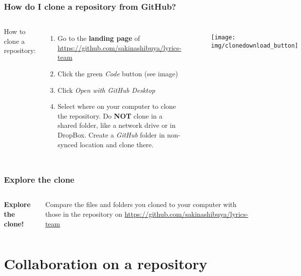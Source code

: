 \documentclass[aspectratio=169]{beamer} %
\newcommand{\trainingURL}[1]{{\color{blue}\url{#1}}}
\newcommand{\traininerUsername}{sakinashibuya}
\newcommand{\repoName}{\traininerUsername/lyrics-team}
\newcommand{\trainingRepoURL}[1]{\trainingURL{https://github.com/\repoName #1}}
\begin{document}
\begin{frame}
\frametitle{How do I clone a repository from GitHub?}

	\begin{columns}[c]

		How to clone a repository:
		\begin{enumerate}
			\item Go to the \textbf{landing page} of \trainingRepoURL{}
			\item Click the green \textit{Code} button (see image)
			\item Click \textit{Open with GitHub Desktop}
			\item Select where on your computer to clone the repository. Do \textbf{NOT} clone in a shared folder, like a network drive or in DropBox. Create a \textit{GitHub} folder in non-synced location and clone there.
		\end{enumerate}

		\begin{figure}
			\centering
			\texttt{[image: img/clonedownload\_button]}
			\label{fig:clonedownloadbutton}
		\end{figure}

	\end{columns}

\end{frame}


\begin{frame}
\frametitle{Explore the clone}

	\begin{columns}[c]


		\textbf{Explore the clone!}

		\vspace{.5cm}

		Compare the files and folders you cloned to your computer with those in the repository on \trainingRepoURL{}


	\end{columns}

\end{frame}

\section{Collaboration on a repository}
\end{document}

